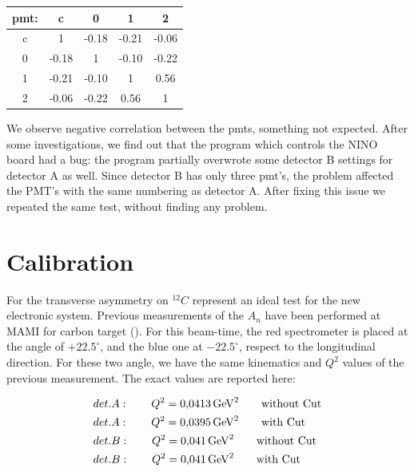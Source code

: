 \begin{center}
\begin{tabular}{|c|c|c|c|c|}
\hline 
pmt: & c & 0 & 1 & 2 \\ 
\hline 
c 	 & 1 & -0.18  & -0.21  & -0.06  \\ 
\hline 
0 	 & -0.18  & 1 & -0.10  & -0.22  \\ 
\hline 
1    & -0.21  & -0.10  & 1 & 0.56  \\ 
\hline 
2    & -0.06 & -0.22  & 0.56  & 1 \\ 
\hline 
\end{tabular} 
\end{center}


We observe negative correlation between the pmts, something not expected. After some investigations, we find out that the program which controls the NINO board had a bug: the program partially overwrote some detector B settings for detector A as well. Since detector B has only three pmt's, the problem affected the PMT's with the same numbering as detector A. After fixing this issue we repeated the same test, without finding any problem. 

\section{Calibration}

For the transverse asymmetry on $^{12}C$ represent an ideal test for the new electronic system. Previous measurements of the $A_{n}$ have been performed at MAMI for carbon target (\cite{}). For this beam-time, the red spectrometer is placed at the angle of $+22.5^{\circ}$, and the blue one at $-22.5^{\circ}$, respect to the longitudinal direction. For these two angle, we have the same kinematics and $Q^{2}$ values of the previous measurement. The exact values are reported here: 

\begin{flushleft}
\begin{align*}
& det. A : \qquad Q^{2} = \SI{0.0413}{\giga \electronvolt \squared} \qquad \textnormal{without Cut} \\
& det. A : \qquad Q^{2} = \SI{0.0395}{\giga \electronvolt \squared} \qquad \textnormal{with Cut} \\
& det. B : \qquad Q^{2} = \SI{0.041}{\giga \electronvolt \squared} \qquad \textnormal{without Cut} \\
& det. B : \qquad Q^{2} = \SI{0.041}{\giga \electronvolt \squared} \qquad \textnormal{with Cut} 
\end{align*} 
\end{flushleft}

